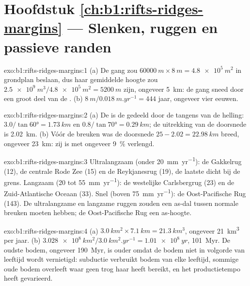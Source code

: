 \section*{Hoofdstuk \ref{ch:b1:rifts-ridges-margins} --- Slenken, ruggen en passieve randen}

\begin{solution}{exo:b1:rifts-ridges-margins:1}
(a) De gang zou $\qty{60000}{m}\times\qty{8}{m} = \qty{4.8e5}{m^2}$ in grondplan beslaan, dus haar gemiddelde hoogte zou $\qty{2.5e9}{m^3}/\qty{4.8e5}{m^2} =
\qty{5200}{m}$ zijn, ongeveer \qty{5}{km}: de gang sneed door een groot deel van de .
(b) $\qty{8}{m}/\qty{0.018}{m.yr^{-1}} = 444$ jaar, ongeveer vier eeuwen.
\end{solution}

\begin{solution}{exo:b1:rifts-ridges-margins:2}
(a) De  is de  gedeeld door de tangens van de helling:
$3.0/\tan\ang{60} = \qty{1.73}{km}$ en $0.8/\tan\ang{70} = \qty{0.29}{km}$;
de uitrekking van de doorsnede is \qty{2.02}{km}. (b) Vóór de breuken was de
doorsnede $25 - 2.02 = \qty{22.98}{km}$ breed, ongeveer \qty{23}{km}: zij is met
ongeveer \qty{9}{\percent} verlengd.
\end{solution}

\begin{solution}{exo:b1:rifts-ridges-margins:3}
Ultralangzaam (onder \qty{20}{mm.yr^{-1}}): de Gakkelrug (12), de centrale Rode Zee (15) en de Reykjanesrug (19), de laatste dicht bij de grens. Langzaam (20 tot \qty{55}{mm.yr^{-1}}): de westelijke Carlsbergrug (23) en de Zuid-Atlantische Oceaan (33). Snel (boven \qty{75}{mm.yr^{-1}}): de Oost-Pacifische Rug (143). De ultralangzame en langzame ruggen zouden een as-dal tussen normale breuken moeten hebben; de Oost-Pacifische Rug een as-hoogte.
\end{solution}

\begin{solution}{exo:b1:rifts-ridges-margins:4}
(a) $\qty{3.0}{km^2}\times\qty{7.1}{km} = \qty{21.3}{km^3}$, ongeveer
\qty{21}{km^3} per jaar. (b) $\qty{3.028e8}{km^2}/\qty{3.0}{km^2.yr^{-1}} =
\qty{1.01e8}{yr}$, \qty{101}{Myr}. De oudste bodem, ongeveer \qty{190}{Myr}, is ouder omdat de bodem niet in volgorde van leeftijd wordt vernietigd: subductie verbruikt bodem van elke leeftijd, sommige oude bodem overleeft waar geen trog haar heeft bereikt, en het productietempo heeft gevarieerd.
\end{solution}


